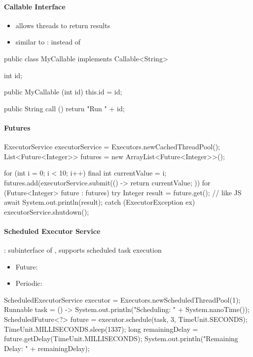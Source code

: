 \paragraph{Callable Interface}
\begin{itemize}
  \item allows threads to return results
  \item similar to :  instead of 
\end{itemize}
\begin{java}
  public class MyCallable implements Callable<String> {
    int id;

    public MyCallable (int id) {
      this.id = id;
    }

    public String call () {
      return "Run " + id;
    }
  }
\end{java}

\paragraph{Futures}
\begin{java}
  ExecutorService executorService = Executors.newCachedThreadPool();
  List<Future<Integer>> futures = new ArrayList<Future<Integer>>();

  for (int i = 0; i < 10; i++) {
    final int currentValue = i;
    futures.add(executorService.submit(() -> { return currentValue; }))
  }
  for (Future<Integer> future : futures) {
    try {
      Integer result = future.get(); // like JS await
      System.out.println(result);
    } catch (ExecutorException ex) {}
  }
  executorService.shutdown();
\end{java}

\paragraph{Scheduled Executor Service}
: subinterface of , supports scheduled task execution
\begin{itemize}
  \item Future: 
  \item Periodic: 
\end{itemize}
\begin{java}
  ScheduledExecutorService executor = 
    Executors.newScheduledThreadPool(1);
  Runnable task = () -> System.out.println("Scheduling: "
    + System.nanoTime());
  ScheduledFuture<?> future = 
    executor.schedule(task, 3, TimeUnit.SECONDS);
  TimeUnit.MILLISECONDS.sleep(1337);
  long remainingDelay = future.getDelay(TimeUnit.MILLISECONDS);
  System.out.println("Remaining Delay: " + remainingDelay);
\end{java}

